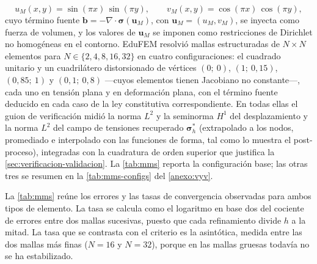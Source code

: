 \begin{equation}
u_M(x,y) = \sin(\pi x)\,\sin(\pi y), \qquad v_M(x,y) = \cos(\pi x)\,\cos(\pi y),
\label{eq:mms-solucion}
\end{equation}
cuyo término fuente $\bm{b} = -\nabla\cdot\bm{\sigma}(\bm{u}_M)$, con $\bm{u}_M = (u_M, v_M)$, se inyecta como fuerza de volumen, y los valores de $\bm{u}_M$ se imponen como restricciones de Dirichlet no homogéneas en el contorno. EduFEM resolvió mallas estructuradas de $N\times N$ elementos para $N\in\{2,4,8,16,32\}$ en cuatro configuraciones: el cuadrado unitario y un cuadrilátero distorsionado de vértices $(0;\ 0)$, $(1;\ 0{,}15)$, $(0{,}85;\ 1)$ y $(0{,}1;\ 0{,}8)$ —cuyos elementos tienen Jacobiano no constante—, cada uno en tensión plana y en deformación plana, con el término fuente deducido en cada caso de la ley constitutiva correspondiente. En todas ellas el guion de verificación midió la norma $L^2$ y la seminorma $H^1$ del desplazamiento y la norma $L^2$ del campo de tensiones recuperado $\bm{\sigma}^*_h$ (extrapolado a los nodos, promediado e interpolado con las funciones de forma, tal como lo muestra el post-proceso), integradas con la cuadratura de orden superior que justifica la \autoref{sec:verificacion-validacion}. La \autoref{tab:mms} reporta la configuración base; las otras tres se resumen en la \autoref{tab:mms-configs} del \autoref{anexo:vyv}.

La \autoref{tab:mms} reúne los errores y las tasas de convergencia observadas para ambos tipos de elemento. La tasa se calcula como el logaritmo en base dos del cociente de errores entre dos mallas sucesivas, puesto que cada refinamiento divide $h$ a la mitad. La tasa que se contrasta con el criterio es la asintótica, medida entre las dos mallas más finas ($N=16$ y $N=32$), porque en las mallas gruesas todavía no se ha estabilizado.

